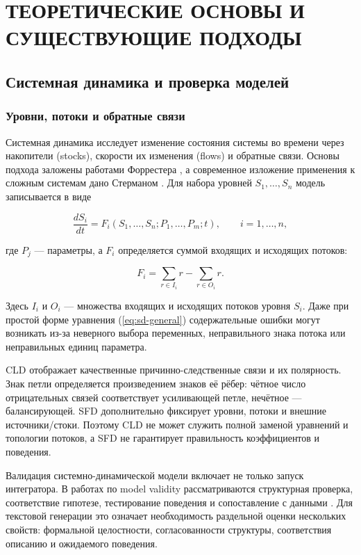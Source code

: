 \chapter{ТЕОРЕТИЧЕСКИЕ ОСНОВЫ И СУЩЕСТВУЮЩИЕ ПОДХОДЫ}

\section{Системная динамика и проверка моделей}

\subsection{Уровни, потоки и обратные связи}

Системная динамика исследует изменение состояния системы во времени через накопители (stocks), скорости их изменения (flows) и обратные связи. Основы подхода заложены работами Форрестера \cite{forrester1961industrial}, а современное изложение применения к сложным системам дано Стерманом \cite{sterman2000business}. Для набора уровней $S_1,\ldots,S_n$ модель записывается в виде

\begin{equation}
    \frac{dS_i}{dt}=F_i(S_1,\ldots,S_n;P_1,\ldots,P_m;t),\qquad i=1,\ldots,n,
    \label{eq:sd-general}
\end{equation}

где $P_j$ --- параметры, а $F_i$ определяется суммой входящих и исходящих потоков:

\begin{equation}
    F_i=\sum_{r\in I_i}r-\sum_{r\in O_i}r.
    \label{eq:flow-balance}
\end{equation}

Здесь $I_i$ и $O_i$ --- множества входящих и исходящих потоков уровня $S_i$. Даже при простой форме уравнения (\ref{eq:sd-general}) содержательные ошибки могут возникать из-за неверного выбора переменных, неправильного знака потока или неправильных единиц параметра.

CLD отображает качественные причинно-следственные связи и их полярность. Знак петли определяется произведением знаков её рёбер: чётное число отрицательных связей соответствует усиливающей петле, нечётное --- балансирующей. SFD дополнительно фиксирует уровни, потоки и внешние источники/стоки. Поэтому CLD не может служить полной заменой уравнений и топологии потоков, а SFD не гарантирует правильность коэффициентов и поведения.

Валидация системно-динамической модели включает не только запуск интегратора. В работах по model validity рассматриваются структурная проверка, соответствие гипотезе, тестирование поведения и сопоставление с данными \cite{barlas1996formal}. Для текстовой генерации это означает необходимость раздельной оценки нескольких свойств: формальной целостности, согласованности структуры, соответствия описанию и ожидаемого поведения.

